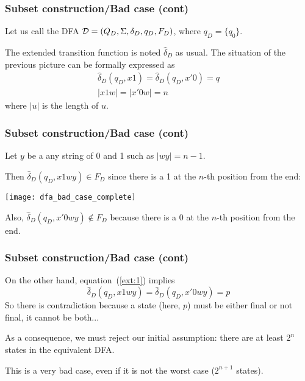 % 
\begin{frame}
\frametitle{Subset construction/Bad case (cont)}

Let us call the DFA \({\cal D} = (Q_D, \Sigma, \delta_D, q_D, F_D)\),
where \(q_D=\{q_0\}\). 

\bigskip

The extended transition function is noted \(\hat{\delta}_D\) as
usual. The situation of the previous picture can be formally expressed
as 
\begin{gather}
\hat{\delta}_D (q_D, x1) = \hat{\delta}_D (q_D, x'0) = q \label{ext:1}\\
\lvert{x1w}\lvert = \lvert{x'0w}\lvert = n
\end{gather}
where \(\lvert{u}\lvert\) is the length of \(u\).

\end{frame}

% 
\begin{frame}
\frametitle{Subset construction/Bad case (cont)}

Let \(y\) be a any string of 0 and 1 such as \(\lvert{wy}\lvert = n -
1\).

\bigskip

Then \(\hat{\delta}_D(q_D, x1wy) \in F_D\) since there is a 1 at the
\(n\)-th position from the end:
\begin{center}
\texttt{[image: dfa\_bad\_case\_complete]}
\end{center}
Also, \(\hat{\delta}_D(q_D,x'0wy) \not\in F_D\) because there is a 0
at the \(n\)-th position from the end.

\end{frame}

% 
\begin{frame}
\frametitle{Subset construction/Bad case (cont)}

On the other hand, equation~(\ref{ext:1}) implies
\[
\hat{\delta}_D (q_D, x1wy) = \hat{\delta}_D (q_D, x'0wy) = p
\]
So there is contradiction because a state (here, \(p\)) must be either
final or not final, it cannot be both...

\bigskip

As a consequence, we must reject our initial assumption: there are at
least \(2^n\) states in the equivalent DFA.

\bigskip

This is a very bad case, even if it is not the worst case (\(2^{n+1}\)
states).

\end{frame}
